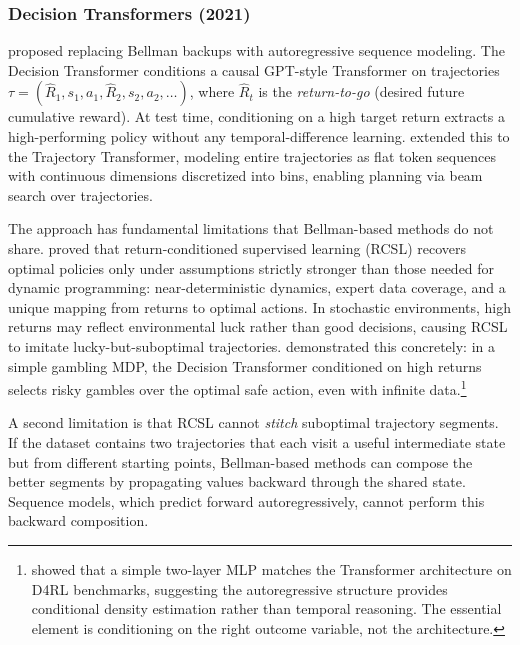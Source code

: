 \subsubsection{Decision Transformers (2021)}
\label{subsubsec:decision_transformers}

\citet{Chen2021DT} proposed replacing Bellman backups with autoregressive
sequence modeling. The Decision Transformer conditions a causal GPT-style
Transformer on trajectories $\tau = (\hat{R}_1, s_1, a_1, \hat{R}_2, s_2,
a_2, \ldots)$, where $\hat{R}_t$ is the \emph{return-to-go} (desired future
cumulative reward). At test time, conditioning on a high target return
extracts a high-performing policy without any temporal-difference learning.
\citet{Janner2021TT} extended this to the Trajectory Transformer, modeling
entire trajectories as flat token sequences with continuous dimensions
discretized into bins, enabling planning via beam search over trajectories.

The approach has fundamental limitations that Bellman-based methods do not
share. \citet{Brandfonbrener2022} proved that return-conditioned supervised
learning (RCSL) recovers optimal policies only under assumptions strictly
stronger than those needed for dynamic programming: near-deterministic
dynamics, expert data coverage, and a unique mapping from returns to optimal
actions. In stochastic environments, high returns may reflect environmental
luck rather than good decisions, causing RCSL to imitate lucky-but-suboptimal
trajectories. \citet{Paster2022} demonstrated this concretely: in a simple
gambling MDP, the Decision Transformer conditioned on high returns selects
risky gambles over the optimal safe action, even with infinite
data.\footnote{\citet{Emmons2022} showed that a simple two-layer MLP matches
the Transformer architecture on D4RL benchmarks, suggesting the
autoregressive structure provides conditional density estimation rather than
temporal reasoning. The essential element is conditioning on the right outcome
variable, not the architecture.}

A second limitation is that RCSL cannot \emph{stitch} suboptimal trajectory
segments. If the dataset contains two trajectories that each visit a useful
intermediate state but from different starting points, Bellman-based methods
can compose the better segments by propagating values backward through the
shared state. Sequence models, which predict forward autoregressively, cannot
perform this backward composition.